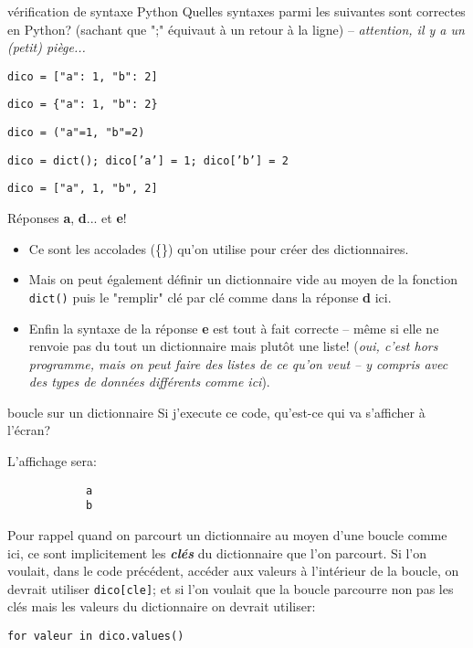 \documentclass[12pt]{article}
\newcommand{\thmquiz}{dictionnaires}
\newcommand{\idquiz}{02}
\newcommand{\classe}{1\textsuperscript{ère} NSI}
\begin{document}
	\thispagestyle{empty} %
	\begin{center}
		\setlength{\fboxrule}{2pt}
		\setlength{\fboxsep}{5pt}
		\fbox{\textbf{{\large \classe \ --- Quiz \idquiz: \thmquiz}}}
		\vspace{0.5em}
	\end{center}
	
	\begin{MonQz}{vérification de syntaxe Python}
		Quelles syntaxes parmi les suivantes sont correctes en Python? (sachant que ";" équivaut à un retour à la ligne) -- \textit{attention, il y a un (petit) piège...}
		\begin{alphenum}
		\item \texttt{dico = ["a": 1, "b": 2]}
		\item \texttt{dico = \{"a": 1, "b": 2\}}
		\item \texttt{dico = ("a"=1, "b"=2)}
		\item \texttt{dico = dict(); dico['a'] = 1; dico['b'] = 2}
		\item \texttt{dico = ["a", 1, "b", 2]}
		\end{alphenum}
	\end{MonQz}
	\begin{MaReponse}
		Réponses \textbf{a}, \textbf{d}... et \textbf{e}!
		\begin{itemize}
			\item Ce sont les accolades (\{\}) qu'on utilise pour créer des dictionnaires.
			\item Mais on peut également définir un dictionnaire vide au moyen de la fonction \texttt{dict()} puis le "remplir" clé par clé comme dans la réponse \textbf{d} ici.
			\item Enfin la syntaxe de la réponse \textbf{e} est tout à fait correcte -- même si elle ne renvoie pas du tout un dictionnaire mais plutôt une liste! (\textit{oui, c'est hors programme, mais on peut faire des listes de ce qu'on veut -- y compris avec des types de données différents comme ici}).
		\end{itemize}
	\end{MaReponse}
	
	\begin{MonQz}{boucle sur un dictionnaire}
		Si j'execute ce code, qu'est-ce qui va s'afficher à l'écran?
	\end{MonQz}
	\begin{MaReponse}
		L'affichage sera:
		\begin{verbatim}
			a
			b
		\end{verbatim}
		Pour rappel quand on parcourt un dictionnaire au moyen d'une boucle comme ici, ce sont implicitement les \textbf{\textit{clés}} du dictionnaire que l'on parcourt. Si l'on voulait, dans le code précédent, accéder aux valeurs à l'intérieur de la boucle, on devrait utiliser \texttt{dico[cle]}; et si l'on voulait que la boucle parcourre non pas les clés mais les valeurs du dictionnaire on devrait utiliser:
		
		\texttt{for valeur in dico.values()}
	\end{MaReponse}
	
\end{document}
